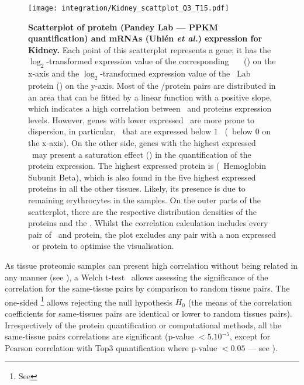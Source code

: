 \begin{figure}[!htbp]
    \texttt{[image: integration/Kidney\_scattplot\_Q3\_T15.pdf]}\centering
    \caption[Scatterplot of protein (Pandey Lab data --- PPKM quantification)
    and mRNA (Uhlén \etal) expression for Kidney]
    {\label{fig:ScatKid}\textbf{Scatterplot of
    protein (Pandey Lab --- PPKM quantification) and mRNAs (Uhlén \textit{et al.})
    expression for Kidney.}
    Each point of this scatterplot represents a gene;
    it has the $\log_2$-transformed expression value
    of the corresponding \uhlen\ \etal\ \mRNA\ (\FPKM) on the x-axis and
    the $\log_2$-transformed expression value of
    the \pandey\ Lab protein (\PPKM) on the y-axis.
    Most of the \mRNA/protein pairs are distributed in an area
    that can be fitted by a linear function with a positive slope,
    which indicates a high correlation between \mRNAs\ and proteins expression
    levels.
    However, genes with lower expressed \mRNAs\ are more prone to dispersion,
    in particular, \mRNAs\ that are expressed below $1$ \FPKM\ (\ie\ below $0$ on
    the x-axis).
    On the other side, genes with the highest expressed \mRNAs\ may present
    a saturation effect ()
    in the quantification of the protein expression.
    The highest expressed protein is 
    (\ie\ Hemoglobin Subunit Beta), which is also found in
    the five highest expressed proteins in all the other tissues.
    Likely, its presence is due to remaining erythrocytes in the samples.
    On the outer parts of the scatterplot,
    there are the respective distribution densities of the proteins and the \mRNAs.
    Whilst the correlation calculation includes every pair of \mRNA\ and protein,
    the plot excludes any pair with a non expressed \mRNA\ or protein to optimise the visualisation.}
\end{figure}

As tissue proteomic samples can present high correlation
without being related in any manner
(see ),
a Welch t-test~ allows
assessing the significance of the correlation for the same-tissue pairs
by comparison to random tissue pairs.
The one-sided \Welchttest\footnote{See }
allows rejecting the null hypothesis $H_0$
(the means of the correlation coefficients for same-tissues pairs
are identical or lower to random tissues pairs).
Irrespectively of the protein quantification or computational methods,
all the same-tissue pairs correlations are significant
(p-value $<5.10^{-5}$, except for Pearson correlation with Top3 quantification
where p-value $<0.05$ --- see ).\mybr\

